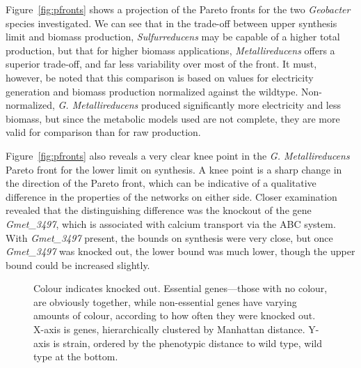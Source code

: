 \documentclass[a4paper,11pt]{article}
\begin{document}
Figure~\ref{fig:pfronts} shows a projection of the Pareto fronts for the two {\it Geobacter} species investigated. We can see that in the trade-off between upper synthesis limit and biomass production, {\it Sulfurreducens} may be capable of a higher total production, but that for higher biomass applications, {\it Metallireducens }offers a superior trade-off, and far less variability over most of the front. It must, however, be noted that this comparison is based on values for electricity generation and biomass production normalized against the wildtype. Non-normalized, {\it G. Metallireducens} produced significantly more electricity and less biomass, but since the metabolic models used are not complete, they are more valid for comparison than for raw production.

Figure~\ref{fig:pfronts} also reveals a very clear knee point in the {\it G. Metallireducens} Pareto front for the lower limit on synthesis. A knee point is a sharp change in the direction of the Pareto front, which can be indicative of a qualitative difference in the properties of the networks on either side. Closer examination revealed that the distinguishing difference was the knockout of the gene {\it Gmet\_3497}, which is associated with calcium transport via the ABC system. With {\it Gmet\_3497} present, the bounds on synthesis were very close, but once {\it Gmet\_3497} was knocked out, the lower bound was much lower, though the upper bound could be increased slightly.

\begin{figure}[!htb]
\caption{Colour indicates knocked out. Essential genes---those with no colour, are obviously together, while non-essential genes have varying amounts of colour, according to how often they were knocked out. X-axis is genes, hierarchically clustered by Manhattan distance. Y-axis is strain, ordered by the phenotypic distance to wild type, wild type at the bottom. \label{fig:heatmap}} 
\end{figure}
\end{document}
